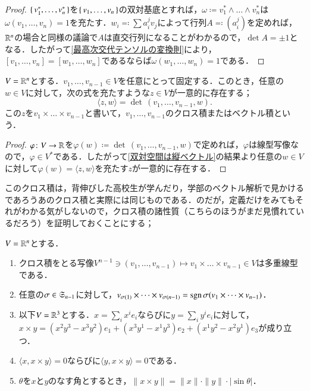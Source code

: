 \begin{proof}
$\set{v_1^*, \dots, v_n^*}$を$\set{v_1, \dots ,v_n}$の双対基底とすれば，$\omega \coloneqq v_1^* \wedge \dots \wedge v_n^*$は$\omega(v_1, \dots ,v_n) = 1$を充たす．$w_i \eqqcolon \sum a_i^j v_j$によって行列$A \eqqcolon \left(a_i^j\right)$を定めれば，$\mathbb{R}^n$の場合と同様の議論で$A$は直交行列になることがわかるので，$\det A = \pm 1$となる．したがって\cref{最高次交代テンソルの変換則}により，$[v_1, \dots, v_n] = [w_1, \dots, w_n]$であるならば$\omega(w_1, \dots, w_n) = 1$である．
\end{proof}

\begin{prop}
$V = \mathbb{R}^n$とする．$v_1, \dots, v_{n-1} \in V$を任意にとって固定する．このとき，任意の$w \in V$に対して，次の式を充たすような$z \in V$が一意的に存在する；
\begin{equation}
\langle z,w \rangle = \det\, (v_1, \dots, v_{n-1}, w).
\end{equation}この$z$を$v_1 \times \dots \times v_{n-1}$と書いて，$v_1, \dots, v_{n-1}$のクロス積またはベクトル積という．
\end{prop}

\begin{proof}
$\varphi \colon V \to \mathbb{R}$を$\varphi(w) \coloneqq \det\, (v_1, \dots, v_{n-1}, w)$で定めれば，$\varphi$は線型写像なので，$\varphi \in V^*$である．したがって\cref{双対空間は縦ベクトル}の結果より任意の$w \in V$に対して$\varphi(w) = \langle z,w \rangle$を充たす$z$が一意的に存在する．
\end{proof}

このクロス積は，背伸びした高校生が学んだり，学部のベクトル解析で見かけるであろうあのクロス積と実際には同じものである．のだが，定義だけをみてもそれがわかる気がしないので，クロス積の諸性質（こちらのほうがまだ見慣れているだろう）を証明しておくことにする；

\begin{prop}[クロス積の基本性質]$V = \mathbb{R}^n$とする．
\begin{enumerate}
\item クロス積をとる写像$V^{n-1} \ni (v_1, \dots, v_{n-1}) \mapsto v_1 \times \dots \times v_{n-1} \in V$は多重線型である．
\item 任意の$\sigma \in \mathfrak{S}_{n-1}$に対して，$v_{\sigma(1)} \times \dots \times v_{\sigma(n-1)} = \operatorname{sgn} \sigma (v_1 \times \dots \times v_{n-1})$．
\item 以下$V=\mathbb{R}^3$とする．$x = \sum_i x^i e_i$ならびに$y = \sum_i y^i e_i$に対して，$x \times y = (x^2y^3 - x^3y^2)e_1 + (x^3y^1 - x^1y^3)e_2 + (x^1y^2 - x^2y^1)e_3$が成り立つ．
\item $\langle x, x \times y \rangle = 0$ならびに$\langle y, x \times y \rangle = 0$である．
\item $\theta$を$x$と$y$のなす角とするとき，$\|x \times y\| = \|x\| \cdot \|y\| \cdot \lvert \sin \theta \rvert$．
\end{enumerate}
\end{prop}

